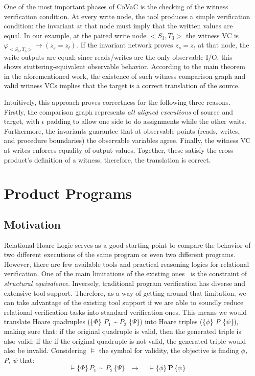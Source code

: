 One of the most important phases of CoVaC is the checking of the witness verification condition.
At every write node, the tool produces a simple verification condition: the invariant at that node must imply that the written values are equal.
In our example, at the paired write node $<S_3, T_3>$ the witness VC is ${\varphi}_{<S_3, T_3>} \rightarrow (z_s = z_t)$.
If the invariant network proves $z_s = z_t$ at that node, the write outputs are equal; since reads/writes are the only observable I/O, this shows stuttering-equivalent observable behavior.
According to the main theorem in the aforementioned work, the existence of such witness comparison graph and valid witness VCs implies that the target is a correct translation of the source.

Intuitively, this approach proves correctness for the following three reasons.
Firstly, the comparison graph represents \emph{all aligned executions} of source and target, with $\epsilon$ padding to allow one side to do assignments while the other waits.
Furthermore, the invariants guarantee that at observable points (reads, writes, and procedure boundaries) the observable variables agree.
Finally, the witness VC at writes enforces equality of output values.
Together, these satisfy the cross-product's definition of a witness, therefore, the translation is correct.


\FloatBarrier
\section{Product Programs} 
\label{sec:product_programs}

\subsection{Motivation} 
\label{subsec:product_programs_motivation}

Relational Hoare Logic serves as a good starting point to compare the behavior of two different executions of the same program or even two different programs.
However, there are few available tools and practical reasoning logics for relational verification.
One of the main limitations of the existing ones~\cite{DBLP:conf/popl/Benton04, DBLP:journals/tcs/Yang07} is the constraint of \emph{structural equivalence}.
Inversely, traditional program verification has diverse and extensive tool support.
Therefore, as a way of getting around that limitation, we can take advantage of the existing tool support if we are able to soundly reduce relational verification tasks into standard verification ones.
This means we would translate Hoare quadruples (\{$\Phi$\} \emph{$P_1$} \emph{\textasciitilde} \emph{$P_2$} \{$\Psi$\}) into Hoare triples (\{$\phi$\} \emph{P} \{$\psi$\}), making sure that: if the original quadruple is valid, then the generated triple is also valid; if the if the original quadruple is not valid, the generated triple would also be invalid.
Considering $\vDash$ the symbol for validity, the objective is finding \emph{$\phi$, P, $\psi$} that:
\[ \vDash \{\Phi\} \, \textbf{$P_1$} \sim \textbf{$P_2$} \, \{\Psi\} \ \ \ \rightarrow \ \ \ \ \ \vDash \{\phi\} \, \textbf{P} \, \{\psi\} \]

